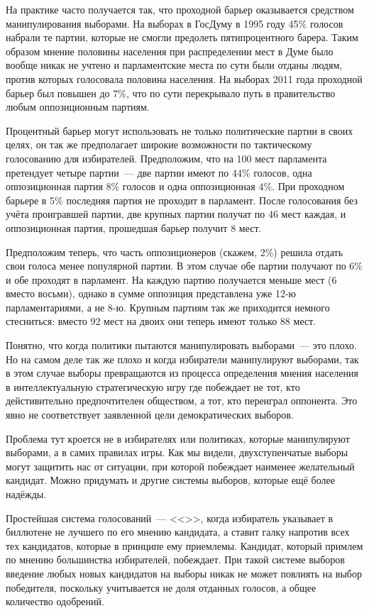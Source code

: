На практике часто получается так, что проходной барьер оказывается средством манипулирования выборами. На выборах в ГосДуму в 1995 году 45\% голосов набрали те партии, которые не смогли предолеть пятипроцентного барера. Таким образом мнение половины населения при распределении мест в Думе было вообще никак не учтено и парламентские места по сути были отданы людям, против которых голосовала половина населения. На выборах 2011 года проходной барьер был повышен до 7\%, что по сути перекрывало путь в правительство любым оппозиционным партиям.

Процентный барьер могут использовать не только политические партии в своих целях, он так же предполагает широкие возможности по тактическому голосованию для избирателей. Предположим, что на 100 мест парламента претендует четыре партии~--- две партии имеют по 44\% голосов, одна оппозиционная партия 8\% голосов и одна оппозиционная 4\%. При проходном барьере в 5\% последняя партия не проходит в парламент. После голосования без учёта проигравшей партии, две крупных партии получат по 46 мест каждая, и оппозиционная партия, прошедшая барьер получит 8 мест.

Предположим теперь, что часть оппозиционеров (скажем, 2\%) решила отдать свои голоса менее популярной партии. В этом случае обе партии получают по 6\% и обе проходят в парламент. На каждую партию получается меньше мест (6 вместо восьми), однако в сумме оппозиция представлена уже 12-ю парламентариями, а не 8-ю. Крупным партиям так же приходится немного стесниться: вместо 92 мест на двоих они теперь имеют только 88 мест.

Понятно, что когда политики пытаются манипулировать выборами~--- это плохо. Но на самом деле так же плохо и когда избиратели манипулируют выборами, так в этом случае выборы превращаются из процесса определения мнения населения в интеллектуальную стратегическую игру где побеждает не тот, кто дейстивительно предпочтителен обществом, а тот, кто переиграл оппонента. Это явно не соответствует заявленной цели демократических выборов.

Проблема тут кроется не в избирателях или политиках, которые манипулируют выборами, а в самих правилах игры. Как мы видели, двухступенчатые выборы могут защитить нас от ситуации, при которой побеждает наименее желательный кандидат. Можно придумать и другие системы выборов, которые ещё более надёжды.

Простейшая система голосований~--- <<>>, когда избиратель указывает в биллютене не лучшего по его мнению кандидата, а ставит галку напротив всех тех кандидатов, которые в принципе ему приемлемы. Кандидат, который примлем по мнению большинства избирателей, побеждает. При такой системе выборов введение любых новых кандидатов на выборы никак не может повлиять на выбор победителя, поскольку учитывается не доля отданных голосов, а общее количество одобрений.

